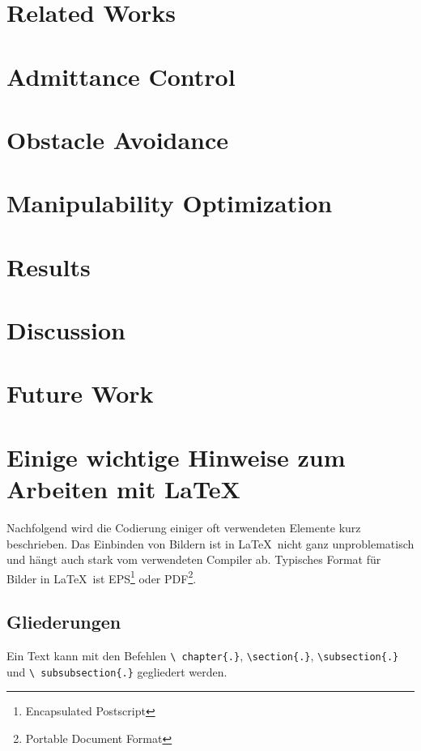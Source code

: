 \chapter{Related Works}

\chapter{Admittance Control}

\chapter{Obstacle Avoidance}

\chapter{Manipulability Optimization}

\chapter{Results}

\chapter{Discussion}

\chapter{Future Work}

\chapter{Einige wichtige Hinweise zum Arbeiten mit \LaTeX\ }
\label{sec:latexumg}

Nachfolgend wird die Codierung einiger oft verwendeten Elemente
kurz beschrieben. Das Einbinden von Bildern ist in \LaTeX\ nicht
ganz unproblematisch und hängt auch stark vom verwendeten Compiler
ab. Typisches Format für Bilder in \LaTeX\ ist
EPS\footnote{Encapsulated Postscript} oder PDF\footnote{Portable Document Format}.


\section{Gliederungen}
\label{sec:gliederung}

Ein Text kann mit den Befehlen \texttt{\textbackslash
chapter\{.\}}, \texttt{\textbackslash section\{.\}},
\texttt{\textbackslash subsection\{.\}} und \texttt{\textbackslash
subsubsection\{.\}} gegliedert werden.


